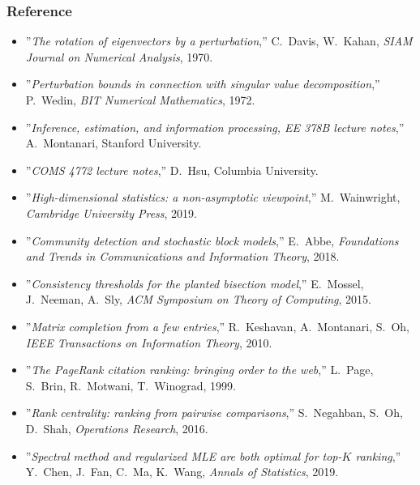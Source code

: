 \documentclass[compress,
mathserif,wide,%
]{beamer}
\begin{document}
\begin{frame}[allowframebreaks]
\frametitle{Reference}

{\small
\begin{itemize}

  \itemsep0.3em
  \item ''\textit{The rotation of eigenvectors by a perturbation},'' C.~Davis, W.~Kahan, \textit{SIAM Journal on Numerical Analysis}, 1970.

  \item ''\textit{Perturbation bounds in connection with singular value decomposition},'' P.~Wedin, \textit{BIT Numerical Mathematics}, 1972.

  \item ''\textit{Inference, estimation, and information processing, EE 378B lecture notes},'' A.~Montanari, Stanford University.

  \item ''\textit{COMS 4772 lecture notes},'' D.~Hsu, Columbia University.

  \item ''\textit{High-dimensional statistics: a non-asymptotic viewpoint},'' M.~Wainwright, \textit{Cambridge University Press}, 2019.


  \item ''\textit{Community detection and stochastic block models},'' E.~Abbe, \textit{Foundations and Trends in Communications and Information Theory}, 2018.

  \item ''\textit{Consistency thresholds for the planted bisection model},'' E.~Mossel, J.~Neeman, A.~Sly, \textit{ACM Symposium on Theory of Computing}, 2015.

  \item ''\textit{Matrix completion from a few entries},'' R.~Keshavan, A.~Montanari, S.~Oh, \textit{IEEE Transactions on Information Theory}, 2010.


  \item ''\textit{The PageRank citation ranking: bringing order to the web},'' L.~Page, S.~Brin, R.~Motwani, T.~Winograd, 1999. 

  \item ''\textit{Rank centrality: ranking from pairwise comparisons},'' S.~Negahban, S.~Oh, D.~Shah, \textit{Operations Research}, 2016. 

  \item ''\textit{Spectral method and regularized MLE are both optimal for top-$K$ ranking},'' Y.~Chen, J.~Fan, C.~Ma, K.~Wang, \textit{Annals of Statistics}, 2019.

\end{itemize}
}


\end{frame}
\end{document}
